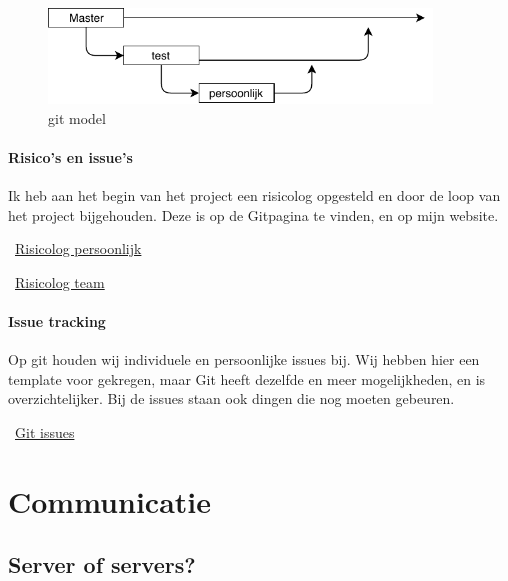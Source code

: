 \documentclass{article}
\begin{document}
\begin{figure}[!h]
        \centering
        \includegraphics[height=1in]{git.pdf}
        \caption{git model}
        \label{fig: git model}
\end{figure}

\paragraph{Risico's en issue's}

Ik heb aan het begin van het project een risicolog opgesteld en door de loop van het project bijgehouden.
Deze is op de Gitpagina te vinden, en op mijn website. \\

\vspace{1mm}

\Mundus~\href{https://github.com/Gewad/Project4Bankalicious/blob/test/opdrachten/opdracht_h/opdracht_h_merijn/opdracht_h.pdf}{Risicolog persoonlijk}

\Mundus~\href{https://github.com/Gewad/Project4Bankalicious/blob/test/opdrachten/opdracht_h/opdracht_h_teamonderdeel.xlsx}{Risicolog team}

\paragraph{Issue tracking}

Op git houden wij individuele en persoonlijke issues bij.
Wij hebben hier een template voor gekregen, maar Git heeft dezelfde en meer mogelijkheden, en is overzichtelijker.
Bij de issues staan ook dingen die nog moeten gebeuren. \\ 

\vspace{1mm}

\Mundus~\href{https://github.com/Gewad/Project4Bankalicious/issues}{Git issues}

\newpage

\section{Communicatie}

\subsection{Server of servers?} 
\end{document}
